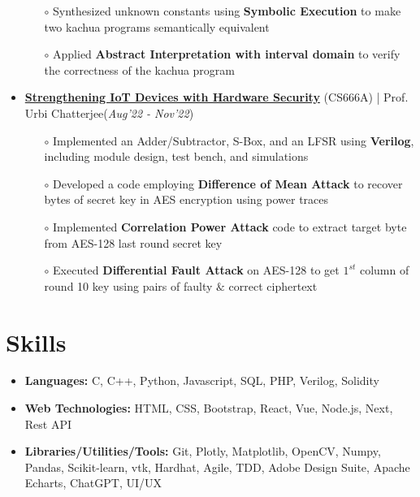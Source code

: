 \documentclass[10.8pt, a4paper]{extarticle}
\newcommand{\shorterSection}[1]{\vspace{-10pt}\section{#1}}
\begin{document}
\begin{itemize}
\begin{itemize}
    \item[$\circ$] Synthesized unknown constants using \textbf{Symbolic Execution} to make two kachua programs semantically equivalent \\[-0.6cm]
    \item[$\circ$] Applied \textbf{Abstract Interpretation with interval domain} to verify the correctness of the kachua program \\[-0.6cm]
	\end{itemize}
  \vspace{0.055cm}
  \item \href{https://github.com/vamshimorlawar/CS666A} {\textbf{Strengthening IoT Devices with Hardware Security}} (CS666A) | Prof. Urbi Chatterjee\hfill\hfill(\textit{Aug'22 - Nov'22})
	\begin{itemize}
	    \item[$\circ$] Implemented an Adder/Subtractor, S-Box, and an LFSR using \textbf{Verilog}, including module design, test bench, and simulations \\[-0.6cm]
	    \item[$\circ$] Developed a code employing \textbf{Difference of Mean Attack} to recover bytes of secret key in AES encryption using power traces\\[-0.6cm]
	    \item[$\circ$] Implemented \textbf{Correlation Power Attack} code to extract target byte from AES-128 last round secret key \\[-0.6cm]
	    \item[$\circ$] Executed \textbf{Differential Fault Attack} on AES-128 to get $1^{st}$ column of round 10 key using pairs of faulty $\&$ correct ciphertext  \\[-0.6cm]
	\end{itemize}
  \vspace{0.055cm}
\medskip
\end{itemize}

\shorterSection{Skills}
\vspace{-2pt}
\begin{itemize}
    \item \textbf{Languages:} C, C++, Python, Javascript, SQL, PHP, Verilog, Solidity
    \item \textbf{Web Technologies:} HTML, CSS, Bootstrap, React, Vue, Node.js, Next, Rest API
    \item \textbf{Libraries/Utilities/Tools:}  Git, Plotly, Matplotlib, OpenCV, Numpy, Pandas, Scikit-learn, vtk, Hardhat, Agile, TDD, Adobe Design Suite, Apache Echarts, ChatGPT, UI/UX
\end{itemize}
\vspace{0.055cm}
\medskip
\end{document}
